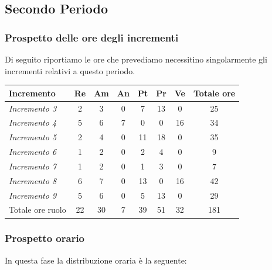 {{{{{{{{{\subsection{Secondo Periodo}\label{PreventivoFaseDiProgettazioneDiDettaglioECodificaPeriodo2}

\subsubsection{Prospetto delle ore degli incrementi}\label{PreventivoFaseDiProgettazioneDiDettaglioECodificaPeriodo2Incrementi}
Di seguito riportiamo le ore che prevediamo necessitino singolarmente gli incrementi relativi a questo periodo.
\quad
\def\tabularxcolumn#1{m{#1}}
{
	
	\begin{center}
		\renewcommand{\arraystretch}{1.4}
		\begin{tabularx}{\textwidth}{|X|c|c|c|c|c|c|c|}
			\hline
			\rowcolor{airforceblue}
			\textbf{Incremento} & \textbf{Re} & \textbf{Am} & \textbf{An} & \textbf{Pt} & \textbf{Pr} & \textbf{Ve} & \textbf{Totale ore}\\
			\hline
			\textit{Incremento 3} & 2 & 3 & 0 & 7 & 13 & 0 & 25\\
			\hline
			\textit{Incremento 4} & 5 & 6 & 7 & 0 & 0 & 16 & 34\\
			\hline
			\textit{Incremento 5} & 2 & 4 & 0 & 11 & 18 & 0 & 35\\
			\hline
			\textit{Incremento 6} & 1 & 2 & 0 & 2 & 4 & 0 & 9\\
			\hline
			\textit{Incremento 7} & 1 & 2 & 0 & 1 & 3 & 0 & 7\\
			\hline
			\textit{Incremento 8} & 6 & 7 & 0 & 13 & 0 & 16 & 42\\
			\hline
			\textit{Incremento 9} & 5 & 6 & 0 & 5 & 13 & 0 & 29\\
			\hline
			Totale ore ruolo & 22 & 30 & 7 & 39 & 51 & 32 & 181\\
			\hline
		\end{tabularx}
	\end{center}
	
	\subsubsection{Prospetto orario}\label{PreventivoFaseDiProgettazioneDiDettaglioECodificaProspettoOrarioPeriodo2}
	In questa fase la distribuzione oraria è la seguente:
	\quad
	\def\tabularxcolumn#1{m{#1}}
	{
		
}}}}}}}}}}}
